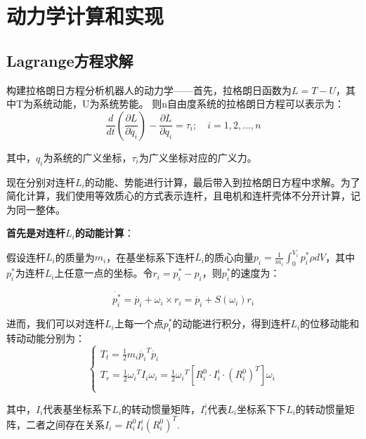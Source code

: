 \documentclass[12pt]{ctexart}
\begin{document}
\newpage



\newpage
\section{动力学计算和实现}
\subsection{Lagrange方程求解}
构建拉格朗日方程分析机器人的动力学——首先，拉格朗日函数为$ L=T-U$，其中T为系统动能，U为系统势能。
则n自由度系统的拉格朗日方程可以表示为：
\begin{equation}
    \frac{d}{dt}\left( \frac{\partial L}{\partial \dot{q}_i} \right) - \frac{\partial L}{\partial q_i} = \tau_i ; \quad i=1,2,...,n
\end{equation}

其中，$q_i$为系统的广义坐标，$\tau_i$为广义坐标对应的广义力。

现在分别对连杆$L_i$的动能、势能进行计算，最后带入到拉格朗日方程中求解。为了简化计算，我们使用等效质心的方式表示连杆，且电机和连杆壳体不分开计算，记为同一整体。

\textbf{首先是对连杆$L_i$的动能计算}：

假设连杆$L_i$的质量为$m_i$，在基坐标系下连杆$L_i$的质心向量$p_i=\frac{1}{m_i}\int_{0}^{V_i}{p_i^\ast\rho dV}$，其中$p_i^\ast$为连杆$L_i$上任意一点的坐标。令$r_i=p_i^\ast-p_i$，则$p_i^\ast$的速度为：

\begin{equation}
    \dot{p_i^{\ast}} = \dot{p_i} + \omega_i \times r_i = \dot{p_i} + S(\omega_i)r_i
\end{equation}

进而，我们可以对连杆$L_i$上每一个点$p_i^\ast$的动能进行积分，得到连杆$L_i$的位移动能和转动动能分别为：
\begin{equation}
    \left\{ \begin{array}{c}	\mathrm{    }T_t=\frac{1}{2}m_i\dot{p_i}^T\dot{p_i}\\	\mathrm{    }T_r=\frac{1}{2}{\omega _i}^TI_i\omega _i=\frac{1}{2}{\omega _i}^T[R_{i}^{0} \cdot I_{i}^{i} \cdot \left( R_{i}^{0} \right) ^T]\omega _i\\\end{array} \right.
\end{equation}

其中，$I_i$代表基坐标系下$L_i$的转动惯量矩阵，$I_i^i$代表$L_i$坐标系下下$L_i$的转动惯量矩阵，二者之间存在关系$I_i=R_i^0 I_i^i (R_i^0)^T$.
\end{document}
